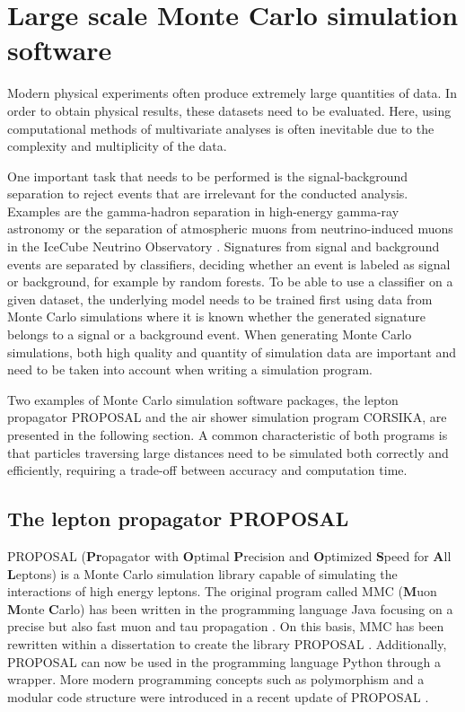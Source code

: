 \chapter{Large scale Monte Carlo simulation software}

\label{sec:theory}

Modern physical experiments often produce extremely large quantities of data.
In order to obtain physical results, these datasets need to be evaluated.
Here, using computational methods of multivariate analyses is often inevitable due to the complexity and multiplicity of the data.

One important task that needs to be performed is the signal-background separation to reject events that are irrelevant for the conducted analysis.
Examples are the gamma-hadron separation in high-energy gamma-ray astronomy \cite{Ohm_2009} or the separation of atmospheric muons from neutrino-induced muons in the IceCube Neutrino Observatory \cite{Ahrens_2004}.
Signatures from signal and background events are separated by classifiers, deciding whether an event is labeled as signal or background, for example by random forests.
To be able to use a classifier on a given dataset, the underlying model needs to be trained first using data from Monte Carlo simulations where it is known whether the generated signature belongs to a signal or a background event.
When generating Monte Carlo simulations, both high quality and quantity of simulation data are important and need to be taken into account when writing a simulation program.

Two examples of Monte Carlo simulation software packages, the lepton propagator PROPOSAL and the air shower simulation program CORSIKA, are presented in the following section.
A common characteristic of both programs is that particles traversing large distances need to be simulated both correctly and efficiently, requiring a trade-off between accuracy and computation time.

\section{The lepton propagator PROPOSAL}

PROPOSAL (\textbf{Pr}opagator with \textbf{O}ptimal \textbf{P}recision and \textbf{O}ptimized \textbf{S}peed for \textbf{A}ll \textbf{L}eptons) is a Monte Carlo simulation library capable of simulating the interactions of high energy leptons.
The original program called MMC (\textbf{M}uon \textbf{M}onte \textbf{C}arlo) has been written in the programming language Java focusing on a precise but also fast muon and tau propagation \cite{chirkin2004propagating}.
On this basis, MMC has been rewritten within a dissertation to create the \CC library PROPOSAL \cite{Kohne:2013zbq}.
Additionally, PROPOSAL can now be used in the programming language Python through a wrapper.
More modern programming concepts such as polymorphism and a modular code structure were introduced in a recent update of PROPOSAL \cite{dunsch_2018_proposal_improvements}.

